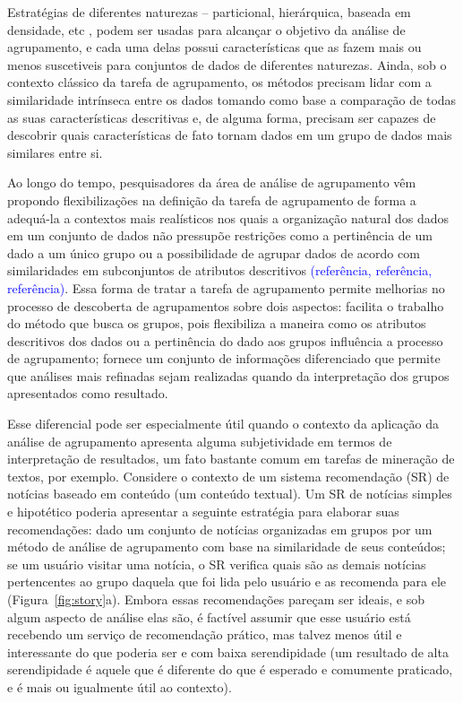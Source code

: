 \documentclass[
    12pt,                %
    oneside,            %
    a4paper,            %
    english,            %
    brazil                %
    ]{abntex2ppgsi}
\begin{document}
Estratégias de diferentes naturezas -- particional, hierárquica, baseada em densidade, etc \cite{Xu2005, han2006data}, podem ser usadas para alcançar o objetivo da análise de agrupamento, e cada uma delas possui características que as fazem mais ou menos suscetiveis para conjuntos de dados de diferentes naturezas. Ainda, sob o contexto clássico da tarefa de agrupamento, os métodos precisam lidar com a similaridade intrínseca entre os dados tomando como base a comparação de todas as suas características descritivas e, de alguma forma, precisam ser capazes de descobrir quais características de fato tornam dados em um grupo de dados mais similares entre si.

Ao longo do tempo, pesquisadores da área de análise de agrupamento vêm propondo flexibilizações na definição da tarefa de agrupamento de forma a adequá-la a contextos mais realísticos nos quais a organização natural dos dados em um conjunto de dados não pressupõe restrições como a pertinência de um dado a um único grupo ou a possibilidade de agrupar dados de acordo com similaridades em subconjuntos de atributos descritivos \textcolor{blue}{(referência, referência, referência)}. Essa forma de tratar a tarefa de agrupamento permite melhorias no processo de descoberta de agrupamentos sobre dois aspectos: facilita o trabalho do método que busca os grupos, pois flexibiliza a maneira como os atributos descritivos dos dados ou a pertinência do dado aos grupos influência a processo de agrupamento; fornece um conjunto de informações diferenciado que permite que análises mais refinadas sejam realizadas quando da interpretação dos grupos apresentados como resultado.

Esse diferencial pode ser especialmente útil quando o contexto da aplicação da análise de agrupamento apresenta alguma subjetividade em termos de interpretação de resultados, um fato bastante comum em tarefas de mineração de textos, por exemplo. Considere o contexto de um sistema recomendação (SR) de notícias baseado em conteúdo (um conteúdo textual). Um SR de notícias simples e hipotético poderia apresentar a seguinte estratégia para elaborar suas recomendações: dado um conjunto de notícias organizadas em grupos por um método de análise de agrupamento com base na similaridade de seus conteúdos; se um usuário visitar uma notícia, o SR verifica quais são as demais notícias pertencentes ao grupo daquela que foi lida pelo usuário e as recomenda para ele (Figura~\ref{fig:story}a). Embora essas recomendações pareçam ser ideais, e sob algum aspecto de análise elas são, é factível assumir que esse usuário está recebendo um serviço de recomendação prático, mas talvez menos útil e interessante do que poderia ser e com baixa serendipidade (um resultado de alta serendipidade é aquele que é diferente do que é esperado e comumente praticado, e é mais ou igualmente útil ao contexto).
\end{document}
